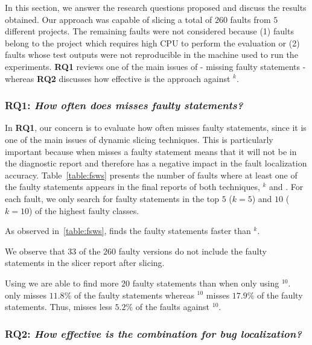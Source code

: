\documentclass{article}
\begin{document}
In this section, we answer the research questions proposed and discuss the
results obtained. Our approach was capable of slicing a total of $260$ faults
from $5$ different  projects. The remaining faults were not considered because
(1) faults belong to the \closure{} project which requires high CPU to perform
the  evaluation  or (2) faults whose test outputs were not
reproducible in the machine used to run the experiments. \textbf{RQ1} reviews
one of the main issues of \ds{} - missing faulty statements - whereas
\textbf{RQ2} discusses how effective is the  approach against
\sfl{}$^{k}$.

\subsubsection{RQ1: \textit{How often does \ds{} misses faulty statements?}}
\label{sec:fault-misses}

In \textbf{RQ1}, our concern is to evaluate how often \ds{} misses faulty
statements,  since it is one of the main issues of dynamic slicing techniques. This 
is particularly important because when \ds{} misses a faulty statement
means that it will not be in the diagnostic report and therefore has a negative
impact in the fault localization accuracy. Table~\ref{table:fsws}  presents the
number of faults where at least one of the faulty statements appears  in the
final reports of both techniques, \sfl{}$^{k}$ and . For each fault,
we  only search for faulty statements in the top $5$ ($k=5$) and $10$ ($k=10$)
of the highest faulty  classes. 


As observed in~\ref{table:fsws},  
finds the faulty statements faster than \sfl{}$^{k}$. 

We observe that $33$ of the $260$ faulty versions do not include the 
faulty statements in the slicer report after slicing.


Using  we are able to find more $20$ faulty
statements than when only using \sfl{}$^{10}$.  only misses $11.8\%$
of the faulty statements whereas \sfl{}$^{10}$ misses $17.9\%$ of the faulty
statements. Thus,  misses less $5.2\%$ of the faults against
\sfl{}$^{10}$.

\subsubsection{RQ2: \textit{How effective is the  combination for bug localization?}}
\end{document}
